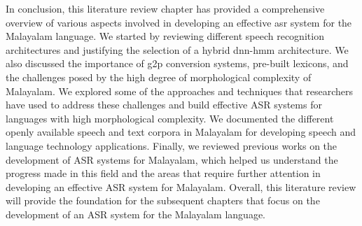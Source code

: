 In conclusion, this literature review chapter has provided a comprehensive overview of various aspects involved in developing an effective \gls{asr} system for the Malayalam language. We started by reviewing different speech recognition architectures and justifying the selection of a hybrid \gls{dnn}-\gls{hmm} architecture. We also discussed the importance of \gls{g2p} conversion systems, pre-built lexicons, and the challenges posed by the high degree of morphological complexity of Malayalam. We explored some of the approaches and techniques that researchers have used to address these challenges and build effective ASR systems for languages with high morphological complexity. We documented the different openly available speech and text corpora in Malayalam for developing speech and language technology applications. Finally, we reviewed previous works on the development of ASR systems for Malayalam, which helped us understand the progress made in this field and the areas that require further attention in developing an effective ASR system for Malayalam. Overall, this literature review will provide the foundation for the subsequent chapters that focus on the development of an ASR system for the Malayalam language.